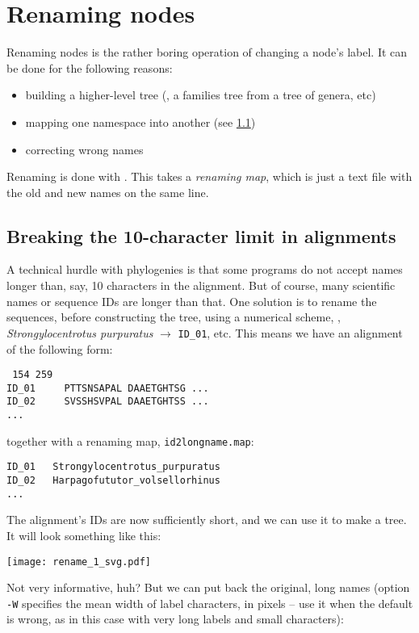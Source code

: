 \section{Renaming nodes}
\label{sct_rename}

Renaming nodes is the rather boring operation of changing a node's label. It
can be done \eg{} for the following reasons:
\begin{itemize}
	\item building a higher-level tree (\ie, a families tree from a tree of genera, etc)
	\item mapping one namespace into another (see \ref{sct_10_char_limit})
	\item correcting wrong names
\end{itemize}

\noindent{}Renaming is done with \rename. This takes a \emph{renaming map},
which is just a text file with the old and new names on the same line.

\subsection{Breaking the 10-character limit in \phylip{} alignments}
\label{sct_10_char_limit}

A technical hurdle with phylogenies is that some programs do not accept names
longer than, say, 10 characters in the \phylip{} alignment. But of
course, many scientific names or sequence \textsc{ID}s are longer than that.
One solution is to rename the sequences, before constructing the tree, using a
numerical scheme, \eg{}, \textit{Strongylocentrotus purpuratus} $\rightarrow$
\texttt{ID\_01}, etc. This means we have an alignment of the following form:
\begin{verbatim}
 154 259
ID_01     PTTSNSAPAL DAAETGHTSG ...
ID_02     SVSSHSVPAL DAAETGHTSS ...
...
\end{verbatim}
together with a renaming map, \texttt{id2longname.map}:
\begin{verbatim}
ID_01	Strongylocentrotus_purpuratus
ID_02	Harpagofututor_volsellorhinus
...
\end{verbatim}
The alignment's \textsc{ID}s are now sufficiently short, and we can use it to
make a tree. It will look something like this:


\begin{center}
\texttt{[image: rename\_1\_svg.pdf]}
\end{center}

\noindent{}Not very informative, huh? But we can put back the original, long
names (option \texttt{-W} specifies the mean width of label characters, in
pixels -- use it when the default is wrong, as in this case with very long
labels and small characters):

